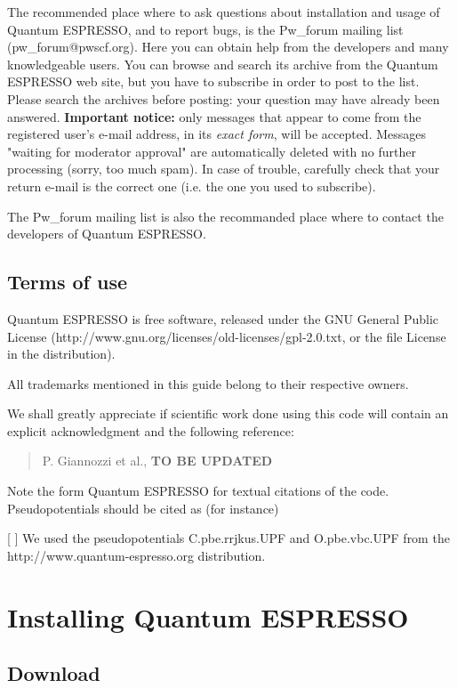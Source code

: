 \documentclass[12pt,a4paper]{article}
\begin{document}
The recommended place where to ask questions about installation and
usage of Quantum ESPRESSO, and to report bugs, is the Pw\_forum mailing
list (pw\_forum@pwscf.org). Here you can obtain help from the developers
and many knowledgeable users. You can browse and search its archive from 
the Quantum ESPRESSO web site, but you have to subscribe in order to post 
to the list.
Please search the archives before posting: your question may have already
been answered.
{\bf Important notice:} only messages that appear to come from the 
registered user's e-mail address, in its {\em exact form}, will be
accepted. Messages "waiting for moderator approval" are automatically 
deleted with no further processing (sorry, too much spam). In case of 
trouble, carefully check that your return e-mail is the correct one 
(i.e. the one you used to subscribe).

The Pw\_forum mailing list is also the recommanded place where to 
contact the developers of Quantum ESPRESSO.
 
\subsection{Terms of use}

Quantum ESPRESSO is free software, released under the 
GNU General Public License 
(http://www.gnu.org/licenses/old-licenses/gpl-2.0.txt, 
or the file License in the distribution).
    
All trademarks mentioned in this guide belong to their respective owners.
    
We shall greatly appreciate if scientific work done using this code will 
contain an explicit acknowledgment and the following reference:
\begin{quote}
P. Giannozzi et al., {\bf TO BE UPDATED}
\end{quote}
Note the form {\sc Quantum ESPRESSO} for textual citations of the code.
Pseudopotentials should be cited as (for instance)

[ ] We used the pseudopotentials C.pbe.rrjkus.UPF
and O.pbe.vbc.UPF from the http://www.quantum-espresso.org 
distribution.

\section{Installing Quantum ESPRESSO}

\subsection{Download}
 
\end{document}
